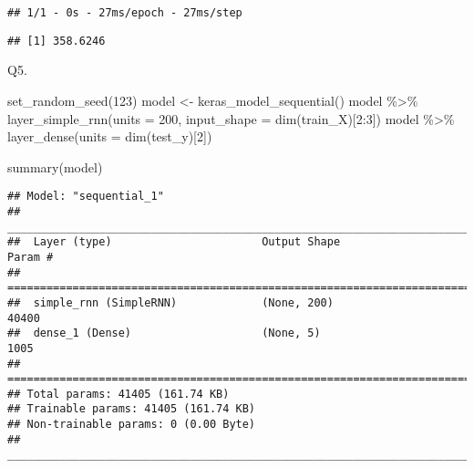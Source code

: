 \documentclass[
]{article}
\newenvironment{Shaded}{\begin{snugshade}}{\end{snugshade}}
\newcommand{\AttributeTok}[1]{\textcolor[rgb]{0.77,0.63,0.00}{#1}}
\newcommand{\DecValTok}[1]{\textcolor[rgb]{0.00,0.00,0.81}{#1}}
\newcommand{\FunctionTok}[1]{\textcolor[rgb]{0.00,0.00,0.00}{#1}}
\newcommand{\NormalTok}[1]{#1}
\newcommand{\OtherTok}[1]{\textcolor[rgb]{0.56,0.35,0.01}{#1}}
\newcommand{\SpecialCharTok}[1]{\textcolor[rgb]{0.00,0.00,0.00}{#1}}
\begin{document}
\begin{verbatim}
## 1/1 - 0s - 27ms/epoch - 27ms/step
\end{verbatim}

\begin{Shaded}
\end{Shaded}

\begin{verbatim}
## [1] 358.6246
\end{verbatim}

Q5.

\begin{Shaded}
\begin{Highlighting}[]
\FunctionTok{set\_random\_seed}\NormalTok{(}\DecValTok{123}\NormalTok{)}
\NormalTok{model }\OtherTok{\textless{}{-}} \FunctionTok{keras\_model\_sequential}\NormalTok{()}
\NormalTok{model }\SpecialCharTok{\%\textgreater{}\%}
  \FunctionTok{layer\_simple\_rnn}\NormalTok{(}\AttributeTok{units =} \DecValTok{200}\NormalTok{, }\AttributeTok{input\_shape =} \FunctionTok{dim}\NormalTok{(train\_X)[}\DecValTok{2}\SpecialCharTok{:}\DecValTok{3}\NormalTok{])}
\NormalTok{model }\SpecialCharTok{\%\textgreater{}\%}
  \FunctionTok{layer\_dense}\NormalTok{(}\AttributeTok{units =} \FunctionTok{dim}\NormalTok{(test\_y)[}\DecValTok{2}\NormalTok{])}

\FunctionTok{summary}\NormalTok{(model)}
\end{Highlighting}
\end{Shaded}

\begin{verbatim}
## Model: "sequential_1"
## ________________________________________________________________________________
##  Layer (type)                       Output Shape                    Param #     
## ================================================================================
##  simple_rnn (SimpleRNN)             (None, 200)                     40400       
##  dense_1 (Dense)                    (None, 5)                       1005        
## ================================================================================
## Total params: 41405 (161.74 KB)
## Trainable params: 41405 (161.74 KB)
## Non-trainable params: 0 (0.00 Byte)
## ________________________________________________________________________________
\end{verbatim}
\end{document}
